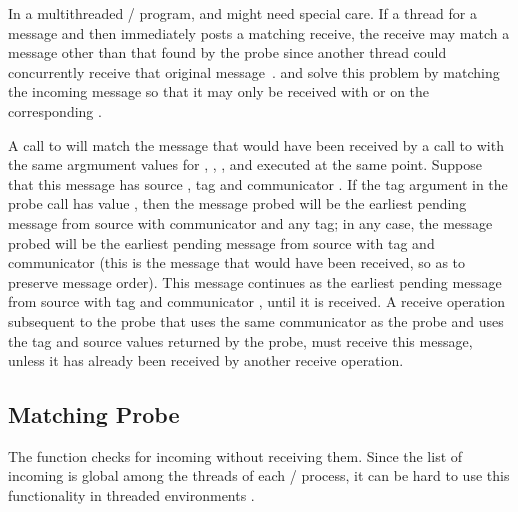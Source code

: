 \begin{users}
In a multithreaded \MPI/ program,  and
 might need special care.
If a thread  for a message and then immediately posts a matching
receive, the receive may match a message other than that found by the probe since another thread could concurrently receive that original
message~\cite{mprobe-paper}.
 and  solve this problem by
matching the incoming message so that it may only be received with
 or  on the corresponding .
\end{users}

\begin{implementors}
A call to  will match the
message that would have been received by a call to 
with the same argmument values for , , , and  executed at the same point.
Suppose
that this message has source , tag  and communicator
.  If the
tag argument in the probe call has value ,
then the message probed
will be the earliest pending message from source 
with communicator  and any tag; in any case, the message probed will be the
earliest pending message from source  with tag  and
communicator
 (this is
the message that would have been received, so as to preserve message order).
This message continues as the earliest pending message
from source  with tag  and communicator , until it is received.
A receive operation subsequent to the probe that uses the same communicator as the
probe and uses the tag and source values returned by the probe, must receive
this message, unless it has already been received by another receive operation.
\end{implementors}

\subsection{Matching Probe}
\label{sec:matching-probe}

The function  checks for incoming  without
receiving them. Since the list of incoming  is global among the
threads of each \MPI/ process, it can be hard to use this functionality
in threaded environments \cite{mprobe-paper,mprobe-proposal-rev4}.

